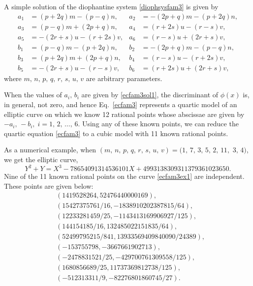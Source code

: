 \documentclass[11pt, leqno]{article}
\begin{document}
A simple solution of the diophantine system \eqref{diophsysfam3} is given by 
\begin{equation}
\begin{aligned}
a_1& = (p+2q)m-(p-q)n, &a_2 &= -(2p+q)m-(p+2q)n,\\
 a_3& = (p-q)m+(2p+q)n, &a_4& = (r+2s)u-(r-s)v, \\
a_5 &= -(2r+s)u-(r+2s)v, &a_6& = (r-s)u+(2r+s)v,\\
b_1 &= (p-q)m-(p+2q)n, &b_2 &= -(2p+q)m-(p-q)n,\\
b_3 &= (p+2q)m+(2p+q)n, &b_4 &= (r-s)u-(r+2s)v,\\
 b_5 &= -(2r+s)u-(r-s)v, &b_6 &= (r+2s)u+(2r+s)v,
\end{aligned} \label{ecfam3sol1}
\end{equation}
where $m,\,n,\,p,\,q,\,r,\,s,\,u,\,v$ are arbitrary parameters.

When the values of $a_i,\,b_i$ are given by \eqref{ecfam3sol1}, the discriminant of  $\phi(x)$ is, in general, not zero, and hence Eq.~\eqref{ecfam3} represents a quartic model of an elliptic curve on which we know  12 rational points whose abscissae are given by $-a_i, \, -b_i,\;i=1,\,2,\,\ldots,\,6$.  Using any of these known points, we can reduce the quartic equation \eqref{ecfam3} to a cubic model with 11 known rational points. 

As a numerical example, when $(m,\,n,\,p,\,q,\,r,\,s,\,u,\,v)=(1,\, 7,\, 3,\, 5,\, 2,\,  11,$ $ 3,\,4)$, 
we get the elliptic curve,
\begin{equation}
Y^2 + Y = X^3 - 78654091314536101X + 4993138309311379361023650. \label{ecfam3ex1}
\end{equation}
Nine of the 11 known rational points on the curve \eqref{ecfam3ex1} are independent. These points are given below:
\begin{equation}
\begin{aligned}
&(1419528264, 52476440000169),\\
&(15427375761/16, -1838910202387815/64),\\
&(12233281459/25, -1143413169906927/125),\\
&(144154185/16, 132485022151835/64),\\
&(52499795215/841, 13933569409840090/24389),\\
&(-153755798, -3667661902713),\\
&(-2478831521/25, -429700761309558/125),\\
&(1680856689/25, 11737369812738/125),\\
&(-512313311/9, -82276801860745/27).
\end{aligned}
\label{pointsecfam3ex1}
\end{equation}
\end{document}
